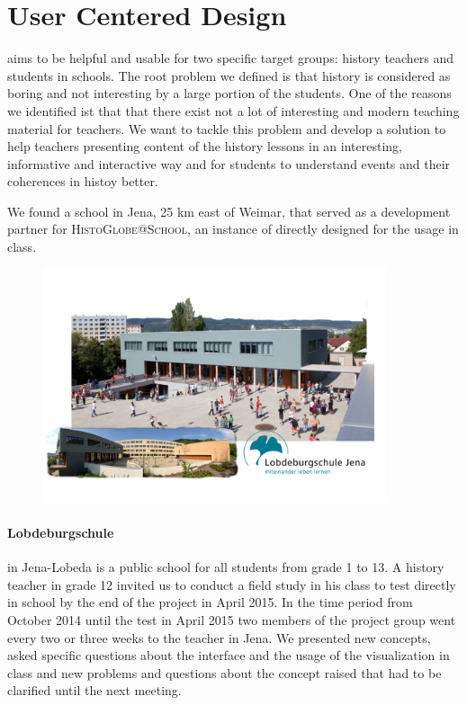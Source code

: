 \section{User Centered Design} %
\label{sec:user_centered_design}

\HG aims to be helpful and usable for two specific target groups: history teachers and students in schools. The root problem we defined is that history is considered as boring and not interesting by a large portion of the students. One of the reasons we identified ist that that there exist not a lot of interesting and modern teaching material for teachers. We want to tackle this problem and develop a solution to help teachers presenting content of the history lessons in an interesting, informative and interactive way and for students to understand events and their coherences in histoy better.

We found a school in Jena, 25 km east of Weimar, that served as a development partner for \textsc{HistoGlobe@School}, an instance of \HG directly designed for the usage in class.

\begin{figure}[H]
  \centering
  \includegraphics[width=0.9\textwidth]{graphics/lobdeburgschule.jpg}
\end{figure}

\paragraph{Lobdeburgschule} in Jena-Lobeda is a public school for all students from grade 1 to 13. A history teacher in grade 12 invited us to conduct a field study in his class to test \HG directly in school by the end of the project in April 2015. In the time period from October 2014 until the test in April 2015 two members of the project group went every two or three weeks to the teacher in Jena. We presented new concepts, asked specific questions about the interface and the usage of the visualization in class and new problems and questions about the concept raised that had to be clarified until the next meeting.

